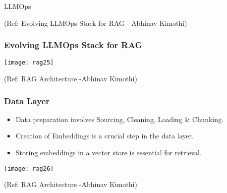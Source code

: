 \begin{frame}[fragile]\frametitle{}
\begin{center}
{\Large  LLMOps}

{\tiny (Ref: Evolving LLMOps Stack for RAG - Abhinav Kimothi)}

\end{center}
\end{frame}

\begin{frame}[fragile]\frametitle{Evolving LLMOps Stack for RAG}


		\begin{center}
		\texttt{[image: rag25]}
		\end{center}

{\tiny (Ref: RAG Architecture -Abhinav  Kimothi)}

\end{frame}

\begin{frame}[fragile]\frametitle{Data Layer}
    \begin{itemize}
        \item Data preparation involves Sourcing, Cleaning, Loading \& Chunking.
        \item Creation of Embeddings is a crucial step in the data layer.
        \item Storing embeddings in a vector store is essential for retrieval.
    \end{itemize}
	
	\begin{center}
	\texttt{[image: rag26]}
	
	{\tiny (Ref: RAG Architecture -Abhinav  Kimothi)}
	\end{center}
		
\end{frame}

